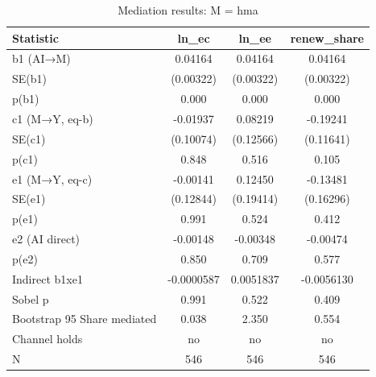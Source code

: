 \begin{table}[htbp]
\centering
\caption{Mediation results: M = hma}
\begin{tabular}{lccc}
\toprule
Statistic & ln\_ec & ln\_ee & renew\_share \\
\midrule
b1 (AI→M) & 0.04164 & 0.04164 & 0.04164 \\
SE(b1) & (0.00322) & (0.00322) & (0.00322) \\
p(b1) & 0.000 & 0.000 & 0.000 \\
c1 (M→Y, eq-b) & -0.01937 & 0.08219 & -0.19241 \\
SE(c1) & (0.10074) & (0.12566) & (0.11641) \\
p(c1) & 0.848 & 0.516 & 0.105 \\
e1 (M→Y, eq-c) & -0.00141 & 0.12450 & -0.13481 \\
SE(e1) & (0.12844) & (0.19414) & (0.16296) \\
p(e1) & 0.991 & 0.524 & 0.412 \\
e2 (AI direct) & -0.00148 & -0.00348 & -0.00474 \\
p(e2) & 0.850 & 0.709 & 0.577 \\
Indirect b1xe1 & -0.0000587 & 0.0051837 & -0.0056130 \\
Sobel p & 0.991 & 0.522 & 0.409 \\
Bootstrap 95%
Share mediated & 0.038 & 2.350 & 0.554 \\
Channel holds & no & no & no \\
\midrule
N & 546 & 546 & 546 \\
\bottomrule
\end{tabular}
\label{tab:h2_hma}
\end{table}
